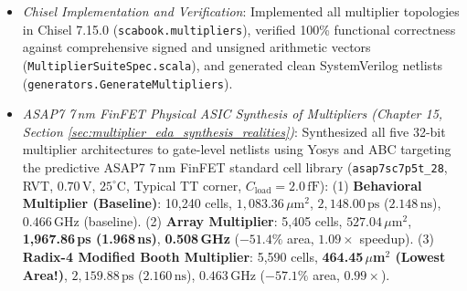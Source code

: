 \begin{itemize}
\begin{itemize}
        (2) \textbf{Radix-4 Modified Booth Multiplier}: Overlapping 3-bit window recoding with digit set $\{-2, -1, 0, +1, +2\}$, cutting the number of partial product rows in half from $N$ to $\lceil (N+1)/2 \rceil$ (32 bits to 17 rows) and slashing reduction hardware.
        (3) \textbf{Wallace and Dadda Carry-Save Trees}: Fast 3:2 and 2:2 compression trees reducing partial products in $O(\log N)$ logic depth, contrasting eager Wallace reduction with deferred Dadda compression, and analyzing deep-submicron interconnect routing congestion trade-offs.
        (4) \textbf{Redundant Binary Multiplier (RBM)}: Formulated the Redundant Binary Signed-Digit (RBSD) representation with digit set $\{-1, 0, 1\}$ encoded as $(x^+, x^-)$, constant-time $O(1)$ carry-free Redundant Binary Adder (RBA) cells using adjacent lower digit condition testing ($p_{i-1} = (x_{i-1} + y_{i-1} > 0)$), and a balanced binary reduction tree ($2 \to 1$ at every node) of depth $\lceil \log_2 N \rceil = 5$. Highlighted its historical and practical prominence in specialized high-performance digital signal processor (DSP) design (such as the IBM Mwave DSP architecture), where strict layout modularity, predictable interconnect lengths, and uniform bit-slice pitch matching avoid the wiring chaos of Wallace trees.
        \item \textit{Chisel Implementation and Verification}: Implemented all multiplier topologies in Chisel 7.15.0 (\texttt{scabook.multipliers}), verified 100\% functional correctness against comprehensive signed and unsigned arithmetic vectors (\texttt{MultiplierSuiteSpec.scala}), and generated clean SystemVerilog netlists (\texttt{generators.GenerateMultipliers}).
        \item \textit{ASAP7 7\,nm FinFET Physical ASIC Synthesis of Multipliers (Chapter 15, Section \ref{sec:multiplier_eda_synthesis_realities})}: Synthesized all five 32-bit multiplier architectures to gate-level netlists using Yosys and ABC targeting the predictive ASAP7 7\,nm FinFET standard cell library (\texttt{asap7sc7p5t\_28}, RVT, $0.70\,\text{V}$, $25^\circ\text{C}$, Typical TT corner, $C_{\text{load}} = 2.0\,\text{fF}$):
        (1) \textbf{Behavioral Multiplier (Baseline)}: 10,240 cells, $1,083.36\,\mu\text{m}^2$, $2,148.00\,\text{ps}$ ($2.148\,\text{ns}$), $0.466\,\text{GHz}$ (baseline).
        (2) \textbf{Array Multiplier}: 5,405 cells, $527.04\,\mu\text{m}^2$, \textbf{1,967.86\,ps (1.968\,ns)}, \textbf{0.508\,GHz} ($-51.4\%$ area, $\mathbf{1.09\times}$ speedup).
        (3) \textbf{Radix-4 Modified Booth Multiplier}: 5,590 cells, \textbf{464.45\,$\mu$m$^2$ (Lowest Area!)}, $2,159.88\,\text{ps}$ ($2.160\,\text{ns}$), $0.463\,\text{GHz}$ ($\mathbf{-57.1\%}$ area, $0.99\times$).

\end{itemize}
\end{itemize}
